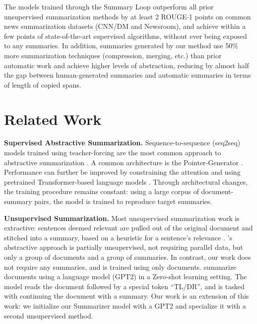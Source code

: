 \documentclass[11pt,a4paper]{article}
\begin{document}
The models trained through the Summary Loop outperform all prior unsupervised summarization methods by at least 2 ROUGE-1 points on common news summarization datasets (CNN/DM and Newsroom), and achieve within a few points of state-of-the-art supervised algorithms, without ever being exposed to any summaries.
In addition, summaries generated by our method use 50$\%$ more summarization techniques (compression, merging, etc.) than prior automatic work and achieve higher levels of abstraction, reducing by almost half the gap between human-generated summaries and automatic summaries in terms of length of copied spans.

 
\section{Related Work}

\textbf{Supervised Abstractive Summarization.} Sequence-to-sequence (seq2seq) \cite{sutskever2014sequence} models trained using teacher-forcing are the most common approach to abstractive summarization \cite{nallapati2016abstractive}. A common architecture is the Pointer-Generator \cite{see2017get}. Performance can further be improved by constraining the attention \cite{gehrmann2018bottom,gui2019attention,wang2019concept} and using pretrained Transformer-based language models \cite{lewis2019bart,chi2019cross,edunov2019pre}. Through architectural changes, the training procedure remains constant: using a large corpus of document-summary pairs, the model is trained to reproduce target summaries.

\textbf{Unsupervised Summarization.} Most unsupervised summarization work is extractive: sentences deemed relevant are pulled out of the original document and stitched into a summary, based on a heuristic for a sentence's relevance \cite{mihalcea2004textrank,barrios2015variations,west2019bottlesum}. \citet{nikolov2019abstractive}'s abstractive approach is partially unsupervised, not requiring parallel data, but only a group of documents and a group of summaries. In contrast, our work does not require any summaries, and is trained using only documents.
\citet{radford2019language} summarize documents using a language model (GPT2) in a Zero-shot learning setting. The model reads the document followed by a special token ``TL/DR'', and is tasked with continuing the document with a summary. Our work is an  extension of this work: we initialize our Summarizer model with a GPT2 and specialize it with a second unsupervised method.
\end{document}

